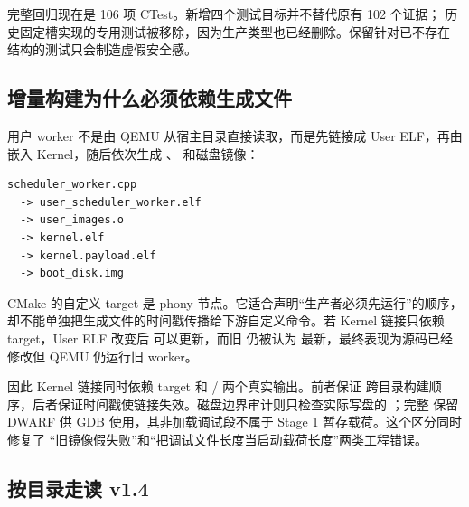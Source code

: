 完整回归现在是 106 项 CTest。新增四个测试目标并不替代原有 102 个证据；
历史固定槽实现的专用测试被移除，因为生产类型也已经删除。保留针对已不存在
结构的测试只会制造虚假安全感。

\subsection{增量构建为什么必须依赖生成文件}

用户 worker 不是由 QEMU 从宿主目录直接读取，而是先链接成 User ELF，再由
 嵌入 Kernel，随后依次生成
、 和磁盘镜像：

\begin{lstlisting}[caption={用户程序进入启动磁盘的真实依赖链}]
scheduler_worker.cpp
  -> user_scheduler_worker.elf
  -> user_images.o
  -> kernel.elf
  -> kernel.payload.elf
  -> boot_disk.img
\end{lstlisting}

CMake 的自定义 target 是 phony 节点。它适合声明“生产者必须先运行”的顺序，
却不能单独把生成文件的时间戳传播给下游自定义命令。若 Kernel 链接只依赖
 target，User ELF 改变后
 可以更新，而旧  仍被认为
最新，最终表现为源码已经修改但 QEMU 仍运行旧 worker。

因此 Kernel 链接同时依赖 target 和
/ 两个真实输出。前者保证
跨目录构建顺序，后者保证时间戳使链接失效。磁盘边界审计则只检查实际写盘的
；完整  保留 DWARF 供
GDB 使用，其非加载调试段不属于 Stage 1 暂存载荷。这个区分同时修复了
“旧镜像假失败”和“把调试文件长度当启动载荷长度”两类工程错误。

\subsection{按目录走读 v1.4}

